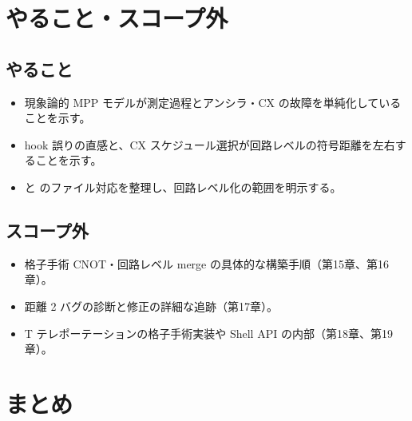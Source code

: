 \section{やること・スコープ外}\label{sec:why_circuit_level_scope}

\subsection{やること}

\begin{itemize}
  \item 現象論的 MPP モデルが測定過程とアンシラ・CX の故障を単純化していることを示す。
  \item hook 誤りの直感と、CX スケジュール選択が回路レベルの符号距離を左右することを示す。
  \item {} と  のファイル対応を整理し、回路レベル化の範囲を明示する。
\end{itemize}

\subsection{スコープ外}

\begin{itemize}
  \item 格子手術 CNOT・回路レベル merge の具体的な構築手順（第15章、第16章）。
  \item 距離 2 バグの診断と修正の詳細な追跡（第17章）。
  \item T テレポーテーションの格子手術実装や Shell API の内部（第18章、第19章）。
\end{itemize}

\section{まとめ}\label{ch14:summary}

